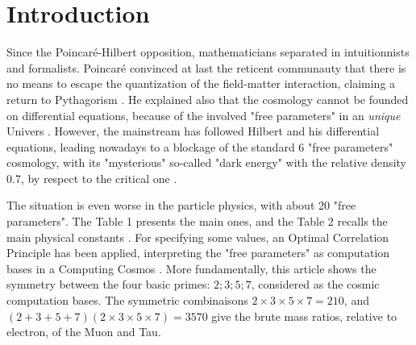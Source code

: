 \documentclass[a4paper,9pt]{article}
\newcounter{col}
\begin{document}









\section{Introduction}

Since the Poincaré-Hilbert opposition, mathematicians separated in intuitionnists and formalists. Poincaré convinced at last the reticent communauty that there is no means to escape the quantization of the field-matter interaction, claiming a return to Pythagorism \cite{Poincare1}. He explained also that the cosmology cannot be founded on differential equations, because of the involved "free parameters" in an \textit{unique} Univers \cite{Poincare2}. However, the mainstream has followed Hilbert and his differential equations, leading nowadays to a blockage of the standard 6 "free parameters" cosmology, with its "mysterious" so-called "dark energy" with the relative density 0.7, by respect to the critical one \cite{Zyla}. 

The situation is even worse in the particle physics, with about 20 "free parameters". The Table 1 presents the main ones, and the Table 2 recalls the main physical constants \cite{Zyla}. For specifying some values, an Optimal Correlation Principle has been applied, interpreting the "free parameters" as computation bases in a Computing Cosmos \cite {Sanchez2}. More fundamentally, this article shows the symmetry between the four basic primes: $2;3;5;7$, considered as the cosmic computation bases. The symmetric combinaisons $2\times 3\times5\times7 = 210 $, and $(2 + 3+  5 +7)(2\times 3\times5\times7) = 3570$ give the brute mass ratios, relative to electron, of the Muon and Tau.
\end{document}
